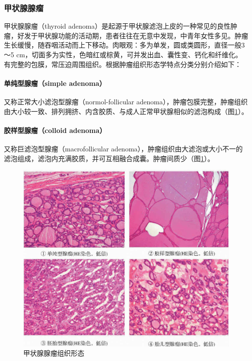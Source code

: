 \subsubsection{甲状腺腺瘤}

甲状腺腺瘤（thyroid
adenoma）是起源于甲状腺滤泡上皮的一种常见的良性肿瘤，好发于甲状腺功能的活动期，患者往往在无意中发现，中青年女性多见。肿瘤生长缓慢，随吞咽活动而上下移动。肉眼观：多为单发，圆或类圆形，直径一般3～5
cm，切面多为实性，色暗红或棕黄，可并发出血、囊性变、钙化和纤维化。有完整的包膜，常压迫周围组织。根据肿瘤组织形态学特点分类分别介绍如下：

\paragraph{单纯型腺瘤（simple adenoma）}
又称正常大小滤泡型腺瘤（normol-follicular
adenoma），肿瘤包膜完整，肿瘤组织由大小较一致、排列拥挤、内含胶质、与成人正常甲状腺相似的滤泡构成（图\ref{fig12-4}）。

\paragraph{胶样型腺瘤（colloid adenoma）}
又称巨滤泡型腺瘤（macrofollicular
adenoma），肿瘤组织由大滤泡或大小不一的滤泡组成，滤泡内充满胶质，并可互相融合成囊。肿瘤间质少（图\ref{fig12-4}）。

\begin{figure}[!htbp]
 \centering
 \includegraphics{./images/Image00211.jpg}
 \captionsetup{justification=centering}
 \caption{甲状腺腺瘤组织形态}
 \label{fig12-4}
  \end{figure} 

